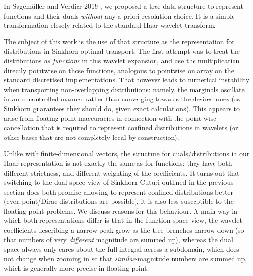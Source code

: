 \documentclass[a4paper]{easychair}
\begin{document}
In Sagemüller and Verdier 2019 \cite{SagVerdier-LazyWavelet}, we proposed a tree data structure to represent functions and their duals \emph{without} any a-priori resolution choice. It is a simple transformation closely related to the standard Haar wavelet transform.

The subject of this work is the use of that structure as the representation for distributions in Sinkhorn optimal transport. The first attempt was to treat the distributions \emph{as functions} in this wavelet expansion, and use the multiplication directly pointwise on those functions, analogous to pointwise on array on the standard discretised implementations.
That however leads to numerical instability when transporting non-overlapping distributions: namely, the marginals oscillate in an uncontrolled manner rather than converging towards the desired ones (as Sinkhorn guarantees they should do, given exact calculations). This appears to arise from floating-point inaccuracies in connection with the point-wise cancellation that is required to represent confined distributions in wavelets (or other bases that are not completely local by construction).

Unlike with finite-dimensional vectors, the structure for duals/distributions in our Haar representation is not exactly the same as for functions: they have both different strictness, and different weighting of the coefficients.
It turns out that switching to the dual-space view of Sinkhorn-Cuturi outlined in the previous section does both promise allowing to represent confined distributions better (even point/Dirac-distributions are possible), it is also less susceptible to the floating-point problems. We discuss reasons for this behaviour.
A main way in which both representations differ is that in the function-space view, the wavelet coefficients describing a narrow peak grow as the tree branches narrow down (so that numbers of very \emph{different} magnitude are summed up), whereas the dual space always only cares about the full integral across a subdomain, which does not change when zooming in so that \emph{similar}-magnitude numbers are summed up, which is generally more precise in floating-point.



%
%

%
%
%



\end{document}
